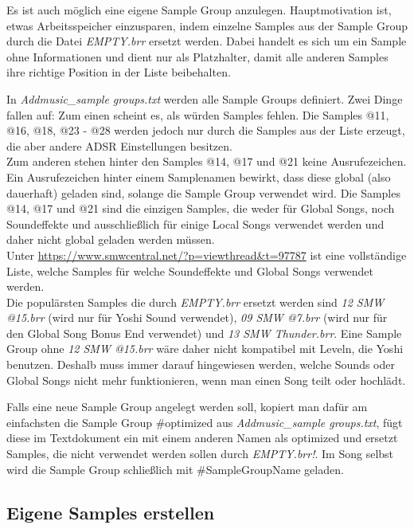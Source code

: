 Es ist auch möglich eine eigene Sample Group anzulegen. Hauptmotivation ist, etwas Arbeitsspeicher einzusparen, indem einzelne Samples aus der Sample Group durch die Datei \textit{EMPTY.brr} ersetzt werden. Dabei handelt es sich um ein Sample ohne Informationen und dient nur als Platzhalter, damit alle anderen Samples ihre richtige Position in der Liste beibehalten.

\bigskip

In \textit{Addmusic\_sample groups.txt} werden alle Sample Groups definiert. Zwei Dinge fallen auf: Zum einen scheint es, als würden Samples fehlen. Die Samples @11, @16, @18, @23 - @28 werden jedoch nur durch die Samples aus der Liste erzeugt, die aber andere ADSR Einstellungen besitzen. \\

Zum anderen stehen hinter den Samples @14, @17 und @21 keine Ausrufezeichen. Ein Ausrufezeichen hinter einem Samplenamen bewirkt, dass diese global (also dauerhaft) geladen sind, solange die Sample Group verwendet wird. Die Samples @14, @17 und @21 sind die einzigen Samples, die weder für Global Songs, noch Soundeffekte und ausschließlich für einige Local Songs verwendet werden und daher nicht global geladen werden müssen. \\
Unter \href{https://www.smwcentral.net/?p=viewthread\&t=97787}{https://www.smwcentral.net/?p=viewthread\&t=97787} ist eine vollständige Liste, welche Samples für welche Soundeffekte und Global Songs verwendet werden. \\
Die populärsten Samples die durch \textit{EMPTY.brr} ersetzt werden sind \textit{12 SMW @15.brr} (wird nur für Yoshi Sound verwendet), \textit{09 SMW @7.brr} (wird nur für den Global Song Bonus End verwendet) und \textit{13 SMW Thunder.brr}. Eine Sample Group ohne \textit{12 SMW @15.brr} wäre daher nicht kompatibel mit Leveln, die Yoshi benutzen. Deshalb muss immer darauf hingewiesen werden, welche Sounds oder Global Songs nicht mehr funktionieren, wenn man einen Song teilt oder hochlädt.

\bigskip

Falls eine neue Sample Group angelegt werden soll, kopiert man dafür am einfachsten die Sample Group \#optimized aus \textit{Addmusic\_sample groups.txt}, fügt diese im Textdokument ein mit einem anderen Namen als optimized und ersetzt Samples, die nicht verwendet werden sollen durch \textit{\dq EMPTY.brr\dq{}!}. Im Song selbst wird die Sample Group schließlich mit \#SampleGroupName geladen.

\subsection{Eigene Samples erstellen}


